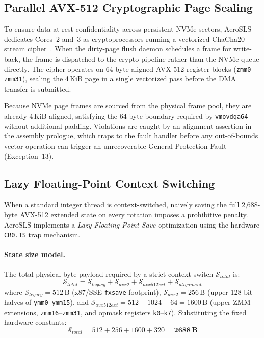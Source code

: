 \documentclass[sigconf]{acmart}
\begin{document}
\subsection{Parallel AVX-512 Cryptographic Page Sealing}
To ensure data-at-rest confidentiality across persistent NVMe
sectors, AeroSLS dedicates Cores~2 and~3 as cryptoprocessors
running a vectorized ChaCha20 stream
cipher~\cite{chacha20}.  When the dirty-page flush daemon
schedules a frame for write-back, the frame is dispatched to
the crypto pipeline rather than the NVMe queue directly.  The
cipher operates on 64-byte aligned AVX-512 register blocks
(\texttt{zmm0}--\texttt{zmm31}), sealing the 4\,KiB page in a
single vectorized pass before the DMA transfer is submitted.

Because NVMe page frames are sourced from the physical frame pool,
they are already 4\,KiB-aligned, satisfying the 64-byte boundary
required by \texttt{vmovdqa64} without additional padding.
Violations are caught by an alignment assertion in the assembly
prologue, which traps to the fault handler before any
out-of-bounds vector operation can trigger an unrecoverable
General Protection Fault (Exception~13).

\subsection{Lazy Floating-Point Context Switching}
\label{sec:lazy_fpu}

When a standard integer thread is context-switched, naively
saving the full 2,688-byte AVX-512 extended state on every
rotation imposes a prohibitive penalty.  AeroSLS implements a
\emph{Lazy Floating-Point Save} optimization using the hardware
\texttt{CR0.TS} trap mechanism.

\paragraph{State size model.}
The total physical byte payload required by a strict context
switch $\mathcal{S}_{total}$ is:
\begin{equation}
\label{eq:state_size}
\mathcal{S}_{total} =
  \mathcal{S}_{legacy} + \mathcal{S}_{avx2} +
  \mathcal{S}_{avx512ext} + \mathcal{S}_{alignment}
\end{equation}
where $\mathcal{S}_{legacy} = 512\,\text{B}$ (x87/SSE
\texttt{fxsave} footprint), $\mathcal{S}_{avx2} = 256\,\text{B}$
(upper 128-bit halves of \texttt{ymm0}--\texttt{ymm15}), and
$\mathcal{S}_{avx512ext} = 512 + 1024 + 64 = 1600\,\text{B}$
(upper ZMM extensions, \texttt{zmm16}--\texttt{zmm31}, and
opmask registers \texttt{k0}--\texttt{k7}).
Substituting the fixed hardware constants:
\begin{equation}
\mathcal{S}_{total} = 512 + 256 + 1600 + 320 =
  \mathbf{2688\,\text{B}}
\end{equation}
\end{document}
